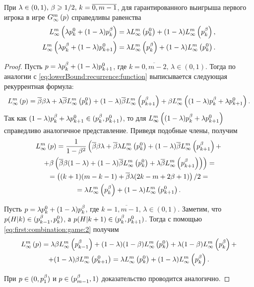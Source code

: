 \begin{proposition}
  \label{proposition:first:combination:game}
  При $\lambda \in (0, 1), \, \Co \geq 1/2, \, k = \overline{0, m-1}$,
  для гарантированного выигрыша первого игрока в игре $\infiniteGame{p}$
  справедливы равенства
  \begin{align*}
    \lowerBound{\lambda \pEven + (1-\lambda) \pOdd}      
    &= 
      \lambda \lowerBound{\pEven} + (1-\lambda) \lowerBound{\pOdd}, \\
    \lowerBound{\lambda \pOdd + (1-\lambda) \pEven[k+1]} 
    &= \lambda \lowerBound{\pOdd} + (1-\lambda) \lowerBound{\pEven}.
  \end{align*}
\end{proposition}
\begin{proof}
  Пусть $p = \lambda \pOdd + (1-\lambda) \pEven[k+1]$, где %
  $k = \overline{0, m - 2}, \, \lambda \in (0, 1)$. Тогда по аналогии с
  \eqref{eq:lowerBound:recurrence:function} выписывается следующая рекуррентная
  формула:
  \[
    \lowerBound{p} = \DCo \Co \lambda + \lambda \DCo
    \lowerBound{\pEven} + (1-\lambda) \DCo \lowerBound{\pOdd[k+1]} +
    \Co \lowerBound{(1-\lambda) \pOdd + \lambda \pEven[k+1]}.
  \]
  Так как %
  $(1-\lambda)\pOdd + \lambda \pEven[k+1] \in (\pOdd, \pEven[k+1])$, то для
  $\lowerBound{(1-\lambda)\pOdd + \lambda \pEven[k+1]}$ справедливо аналогичное
  представление. Приведя подобные члены, получим
  \begin{multline}
    \label{eq:first:combination:game:2}
    \lowerBound{p} = \frac{1}{1-\Co^2}
    \left(
      \DCo\Co\lambda + 
      \DCo\lambda\lowerBound{\pEven} + 
      (1-\lambda)\DCo\lowerBound{\pOdd[k+1]} + 
    \right.\\
    \left. 
      + \Co \left( 
        \DCo\Co(1-\lambda) +
        (1-\lambda)\DCo\lowerBound{\pEven} +
        \lambda\DCo\lowerBound{\pOdd[k+1]} 
      \right)
    \right) = \\
    = \left( (k + 1)(m - k - 1) + \DCo\lambda(2k - m + 2\Co + 1)
    \right)/2 = \\
    = \lambda\lowerBound{\pOdd} + (1-\lambda)\lowerBound{\pEven[k+1]}.
  \end{multline}
  
  Пусть $p = \lambda\pEven + (1-\lambda)\pOdd$, где %
  $k = \overline{1, m - 1}, \, \lambda \in (0, 1)$. Заметим, что %
  $p(H|k) \in ( \pOdd[k-1], \pEven )$, а %
  $p(H|k+1) \in ( \pOdd, \pEven[k+1] )$. Тогда с помощью
  \eqref{eq:first:combination:game:2} получим
  \begin{multline*}
    \lowerBound{p} =
    \lambda \Co \lowerBound{\pOdd[k-1]} + 
    (1-\lambda)(1-\Co)\lowerBound{\pEven} + \lambda(1-\Co)\lowerBound{\pOdd} + \\
    + (1-\lambda)\Co\lowerBound{\pEven[k+1]} 
    = \lambda \lowerBound{\pEven} + (1-\lambda) \lowerBound{\pOdd}.
  \end{multline*}
  
  При $p \in ( 0, \pOdd[1] )$ и $p \in ( \pOdd[m-1], 1 )$ доказательство
  проводится аналогично.
\end{proof}

